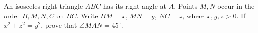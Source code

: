 An isosceles right triangle $ABC$ has its right angle at $A$. Points $M,N$ occur in the order $B,M,N,C$ on $BC$. Write $BM=x$, $MN=y$, $NC=z$, where $x,y,z>0$. If $x^2+z^2=y^2$, prove that $\angle MAN=45^\circ$.
